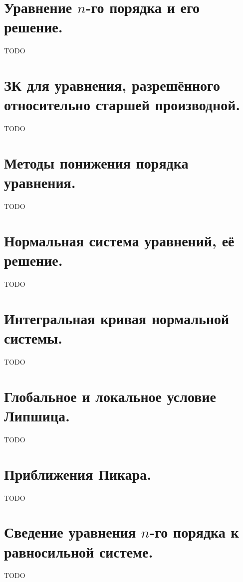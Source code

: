 \documentclass{article}
\begin{document}
\section*{Уравнение $n$-го порядка и его решение.}
TODO

{}
\section*{ЗК для уравнения, разрешённого относительно старшей производной.}
TODO

{}
\section*{Методы понижения порядка уравнения.}
TODO

{}
\section*{Нормальная система уравнений, её решение.}
TODO

{}
\section*{Интегральная кривая нормальной системы.}
TODO

{}
\section*{Глобальное и локальное условие Липшица.}
TODO

{}
\section*{Приближения Пикара.}
TODO

{}
\section*{Сведение уравнения $n$-го порядка к равносильной системе.}
TODO
\end{document}
